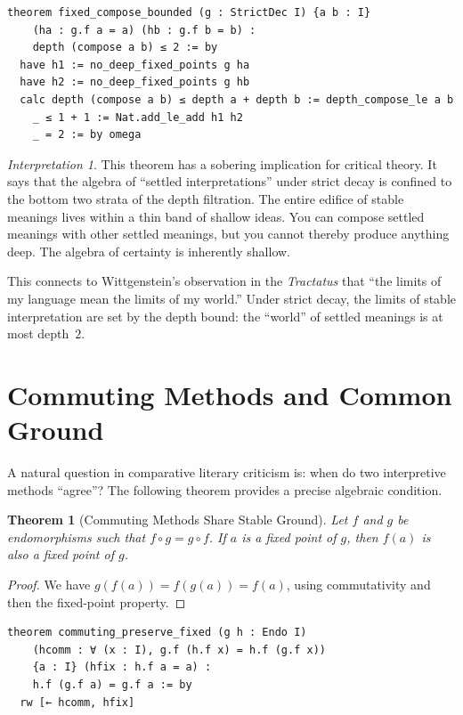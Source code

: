 \documentclass[11pt,openany]{book}
\theoremstyle{definition}
\theoremstyle{plain}
\newtheorem{theorem}[axiom]{Theorem}
\theoremstyle{remark}
\newtheorem{interpretation}[axiom]{Interpretation}
\begin{document}
\begin{lstlisting}[language=Lean4]
theorem fixed_compose_bounded (g : StrictDec I) {a b : I}
    (ha : g.f a = a) (hb : g.f b = b) :
    depth (compose a b) ≤ 2 := by
  have h1 := no_deep_fixed_points g ha
  have h2 := no_deep_fixed_points g hb
  calc depth (compose a b) ≤ depth a + depth b := depth_compose_le a b
    _ ≤ 1 + 1 := Nat.add_le_add h1 h2
    _ = 2 := by omega
\end{lstlisting}

\begin{interpretation}
This theorem has a sobering implication for critical theory. It says that the algebra of ``settled interpretations'' under strict decay is confined to the bottom two strata of the depth filtration. The entire edifice of stable meanings lives within a thin band of shallow ideas. You can compose settled meanings with other settled meanings, but you cannot thereby produce anything deep. The algebra of certainty is inherently shallow.

This connects to Wittgenstein's observation in the \textit{Tractatus} that ``the limits of my language mean the limits of my world.'' Under strict decay, the limits of stable interpretation are set by the depth bound: the ``world'' of settled meanings is at most depth~$2$.
\end{interpretation}

\section{Commuting Methods and Common Ground}

A natural question in comparative literary criticism is: when do two interpretive methods ``agree''? The following theorem provides a precise algebraic condition.

\begin{theorem}[Commuting Methods Share Stable Ground]
\label{thm:commuting-methods}
Let $f$ and $g$ be endomorphisms such that $f \circ g = g \circ f$. If $a$ is a fixed point of $g$, then $f(a)$ is also a fixed point of $g$.
\end{theorem}

\begin{proof}
We have $g(f(a)) = f(g(a)) = f(a)$, using commutativity and then the fixed-point property.
\end{proof}

\begin{lstlisting}[language=Lean4]
theorem commuting_preserve_fixed (g h : Endo I)
    (hcomm : ∀ (x : I), g.f (h.f x) = h.f (g.f x))
    {a : I} (hfix : h.f a = a) :
    h.f (g.f a) = g.f a := by
  rw [← hcomm, hfix]
\end{lstlisting}
\end{document}
